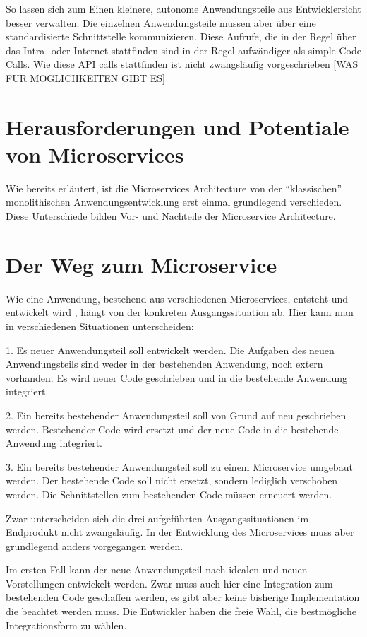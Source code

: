So lassen sich zum Einen kleinere, autonome Anwendungsteile aus Entwicklersicht besser verwalten. Die einzelnen Anwendungsteile müssen aber über eine standardisierte Schnittstelle kommunizieren. Diese Aufrufe, die in der Regel über das Intra- oder Internet stattfinden sind in der Regel aufwändiger als simple Code Calls. Wie diese API calls stattfinden ist nicht zwangsläufig vorgeschrieben [WAS FUR MOGLICHKEITEN GIBT ES]


\section{Herausforderungen und Potentiale von Microservices}
Wie bereits erläutert, ist die Microservices Architecture von der ``klassischen'' monolithischen Anwendungsentwicklung erst einmal grundlegend verschieden. Diese Unterschiede bilden Vor- und Nachteile der Microservice Architecture.

\section{Der Weg zum Microservice}
Wie eine Anwendung, bestehend aus verschiedenen Microservices, entsteht und entwickelt wird , hängt von der konkreten Ausgangssituation ab. Hier kann man in verschiedenen Situationen unterscheiden:

1. Es neuer Anwendungsteil soll entwickelt werden. Die Aufgaben des neuen Anwendungsteils sind weder in der bestehenden Anwendung, noch extern vorhanden. Es wird neuer Code geschrieben und in die bestehende Anwendung integriert.

2. Ein bereits bestehender Anwendungsteil soll von Grund auf neu geschrieben werden. Bestehender Code wird ersetzt und der neue Code in die bestehende Anwendung integriert.

3. Ein bereits bestehender Anwendungsteil soll zu einem Microservice umgebaut werden. Der bestehende Code soll nicht ersetzt, sondern lediglich verschoben werden. Die Schnittstellen zum bestehenden Code müssen erneuert werden.

Zwar unterscheiden sich die drei aufgeführten Ausgangssituationen im Endprodukt nicht zwangsläufig. In der Entwicklung des Microservices muss aber grundlegend anders vorgegangen werden. 

Im ersten Fall kann der neue Anwendungsteil nach idealen und neuen Vorstellungen entwickelt werden. Zwar muss auch hier eine Integration zum bestehenden Code geschaffen werden, es gibt aber keine bisherige Implementation die beachtet werden muss. Die Entwickler haben die freie Wahl, die bestmögliche Integrationsform zu wählen.

